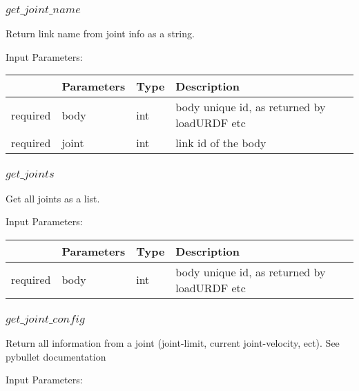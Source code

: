 \documentclass[
	ngerman,
	accentcolor=9c,%
	type=intern,
	marginpar=false
	]{tudapub}
\begin{document}
\subsubsection{$get\_joint\_name$}
\noindent Return link name from joint info as a string.


\vspace{0.5cm}
\noindent Input Parameters:
\vspace{0.5cm}

\begin{tabular}{|p{}|p{}|p{}| p{}|}
\hline
 & \textbf{Parameters} & \textbf{Type} & \textbf{Description} \\
\hline
required & body & int & body unique id, as returned by loadURDF etc\\
\hline
required & joint & int & link id of the body\\
\hline
\end{tabular}
\vspace{0.5cm}


\subsubsection{$get\_joints$}
\noindent Get all joints as a list.


\vspace{0.5cm}
\noindent Input Parameters:
\vspace{0.5cm}

\begin{tabular}{|p{}|p{}|p{}| p{}|}
\hline
 & \textbf{Parameters} & \textbf{Type} & \textbf{Description} \\
\hline
required & body & int & body unique id, as returned by loadURDF etc\\
\hline
\end{tabular}
\vspace{0.5cm}






\subsubsection{$get\_joint\_config$}
\noindent  Return all information from a joint (joint-limit, current joint-velocity, ect). See pybullet documentation 



\vspace{0.5cm}
\noindent Input Parameters:
\vspace{0.5cm}
\end{document}
